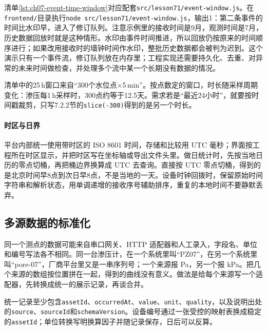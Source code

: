 清单\ref{lst:ch07-event-time-window}对应配套\texttt{src/lesson71/event-window.js}。在\texttt{frontend/}目录执行\texttt{node\allowbreak\ src/lesson71/\allowbreak event-window.js}，输出1：第二条事件的时间比水印早，进入了修订队列。注意示例里的接收时间是9月，观测时间是7月，历史数据回放时就是这种情形。水印由事件时间推进，所以回放仍按原来的时间顺序进行；如果改用接收时的墙钟时间作水印，整批历史数据都会被判为迟到。这个演示只有一个事件流，修订队列放在内存里；工程实现还需要持久化、去重、对异常的未来时间做检查，并处理多个流中某一个长期没有数据的情况。

清单中的25\,h窗口来自“300个水位点×5\,min”。按点数定的窗口，时长随采样周期变化：渗压每1\,h采样时，300点约等于12.5天。需求若是“最近24小时”，就要按时间戳裁剪，只写7.2.2节的\texttt{slice(-300)}得到的是另一个时长。

\paragraph{时区与日界}平台内部统一使用带时区的 ISO 8601 时间，存储和比较用 UTC 毫秒；界面按工程所在时区显示，并把时区写在坐标轴或导出文件头里。做日统计时，先按当地日历的零点切桶，再把桶边界换算成 UTC 去查询。直接按 UTC 零点切桶，得到的是北京时间早8点到次日早8点，不是当地的一天。设备时钟回拨时，保留原始时间字符串和解析状态，用单调递增的接收序号辅助排序，重复的本地时间不要静默丢弃。

\subsection{多源数据的标准化}

同一个测点的数据可能来自串口网关、HTTP 适配器和人工录入，字段名、单位和编号写法各不相同。同一台渗压计，在一个系统里叫“PZ07”，在另一个系统里叫“pore-07”，厂商平台里又是一串序列号；一个来源报 Pa，另一个报 kPa。把几个来源的数组按位置拼在一起，得到的曲线没有意义。做法是给每个来源写一个适配器，先转换成统一的展示记录，再谈合并。

统一记录至少包含\texttt{assetId}、\texttt{occurredAt}、\texttt{value}、\texttt{unit}、\texttt{quality}，以及说明出处的\texttt{source}、\texttt{sourceId}和\texttt{schemaVersion}。设备编号通过一张受控的映射表换成稳定的\texttt{assetId}；单位转换写明换算因子并随记录保存，日后可以反算。

